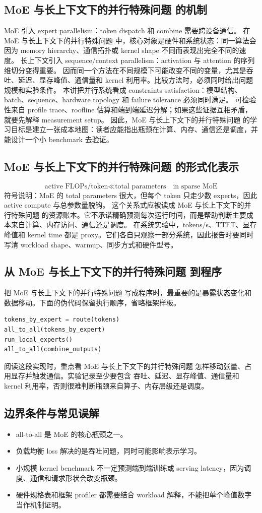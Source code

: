 \documentclass[a4paper]{article}
\begin{document}
\subsection{MoE 与长上下文下的并行特殊问题 的机制}
MoE 引入 expert parallelism：token dispatch 和 combine 需要跨设备通信。 在 MoE 与长上下文下的并行特殊问题 中，核心对象是硬件和系统状态：同一算法会因为 memory hierarchy、通信拓扑或 kernel shape 不同而表现出完全不同的速度。
长上下文引入 sequence/context parallelism：activation 与 attention 的序列维切分变得重要。 因而同一个方法在不同规模下可能改变不同的变量，尤其是吞吐、延迟、显存峰值、通信量和 kernel 利用率。比较方法时，必须同时给出问题规模和实验条件。
本讲把并行系统看成 constraints satisfaction：模型结构、batch、sequence、hardware topology 和 failure tolerance 必须同时满足。 可检验性来自 profile trace、roofline 估算和端到端延迟分解；如果这些证据互相矛盾，就要先解释 measurement setup。
因此，MoE 与长上下文下的并行特殊问题 的学习目标是建立一张成本地图：读者应能指出瓶颈在计算、内存、通信还是调度，并能设计一个小 benchmark 去验证。
\subsection{MoE 与长上下文下的并行特殊问题 的形式化表示}
\[\text{active FLOPs/token}\ll \text{total parameters}\quad\text{in sparse MoE}\]
符号说明：MoE 的 total parameters 很大，但每个 token 只走少数 experts，因此 active compute 与总参数量脱钩。
这个关系式应被读成 MoE 与长上下文下的并行特殊问题 的资源账本。它不承诺精确预测每次运行时间，而是帮助判断主要成本来自计算、内存访问、通信还是调度。
在系统实验中，tokens/s、TTFT、显存峰值和 kernel time 都是 proxy。它们各自只观察一部分系统，因此报告时要同时写清 workload shape、warmup、同步方式和硬件型号。
\subsection{从 MoE 与长上下文下的并行特殊问题 到程序}
把 MoE 与长上下文下的并行特殊问题 写成程序时，最重要的是暴露状态变化和数据移动。下面的伪代码保留执行顺序，省略框架样板。
\begin{lstlisting}[language=Python]
tokens_by_expert = route(tokens)
all_to_all(tokens_by_expert)
run_local_experts()
all_to_all(combine_outputs)
\end{lstlisting}
阅读这段实现时，重点看 MoE 与长上下文下的并行特殊问题 怎样移动张量、占用显存并触发通信。实验记录至少要包含 吞吐、延迟、显存峰值、通信量和 kernel 利用率，否则很难判断瓶颈来自算子、内存层级还是调度。
\subsection{边界条件与常见误解}
\begin{itemize}
\item all-to-all 是 MoE 的核心瓶颈之一。
\item 负载均衡 loss 解决的是吞吐问题，同时可能影响表示学习。
\item 小规模 kernel benchmark 不一定预测端到端训练或 serving latency，因为调度、通信和请求形状会改变瓶颈。
\item 硬件规格表和框架 profiler 都需要结合 workload 解释，不能把单个峰值数字当作机制证明。
\end{itemize}
\end{document}
